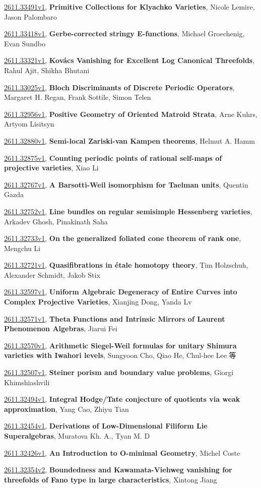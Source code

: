 \documentclass[9pt, a4paper]{article}
\theoremstyle{plain}
\theoremstyle{definition}
\theoremstyle{remark}
\newcommand{\arxiv}[3]{\href{https://arxiv.org/abs/#1}{#1}, \textbf{\textcolor{arxivblue}{#2}}, #3}
\begin{document}
\arxiv{2611.33491v1}{Primitive Collections for Klyachko Varieties}{Nicole Lemire, Jason Palombaro}

\arxiv{2611.33418v1}{Gerbe-corrected stringy E-functions}{Michael Groechenig, Evan Sundbo}

\arxiv{2611.33321v1}{Kovács Vanishing for Excellent Log Canonical Threefolds}{Rahul Ajit, Shikha Bhutani}

\arxiv{2611.33025v1}{Bloch Discriminants of Discrete Periodic Operators}{Margaret H. Regan, Frank Sottile, Simon Telen}

\arxiv{2611.32956v1}{Positive Geometry of Oriented Matroid Strata}{Arne Kuhrs, Artyom Lisitsyn}

\arxiv{2611.32880v1}{Semi-local Zariski-van Kampen theorems}{Helmut A. Hamm}

\arxiv{2611.32875v1}{Counting periodic points of rational self-maps of projective varieties}{Xiao Li}

\arxiv{2611.32767v1}{A Barsotti-Weil isomorphism for Taelman units}{Quentin Gazda}

\arxiv{2611.32752v1}{Line bundles on regular semisimple Hessenberg varieties}{Arkadev Ghosh, Pinakinath Saha}

\arxiv{2611.32733v1}{On the generalized foliated cone theorem of rank one}{Mengchu Li}

\arxiv{2611.32721v1}{Quasifibrations in étale homotopy theory}{Tim Holzschuh, Alexander Schmidt, Jakob Stix}

\arxiv{2611.32597v1}{Uniform Algebraic Degeneracy of Entire Curves into Complex Projective Varieties}{Xianjing Dong, Yanda Lv}

\arxiv{2611.32571v1}{Theta Functions and Intrinsic Mirrors of Laurent Phenomenon Algebras}{Jiarui Fei}

\arxiv{2611.32570v1}{Arithmetic Siegel-Weil formulas for unitary Shimura varieties with Iwahori levels}{Sungyoon Cho, Qiao He, Chul-hee Lee 等}

\arxiv{2611.32507v1}{Steiner porism and boundary value problems}{Giorgi Khimshiashvili}

\arxiv{2611.32494v1}{Integral Hodge/Tate conjecture of quotients via weak approximation}{Yang Cao, Zhiyu Tian}

\arxiv{2611.32454v1}{Derivations of Low-Dimensional Filiform Lie Superalgebras}{Muratova Kh. A., Tyan M. D}

\arxiv{2611.32426v1}{An Introduction to O-minimal Geometry}{Michel Coste}

\arxiv{2611.32354v2}{Boundedness and Kawamata-Viehweg vanishing for threefolds of Fano type in large characteristics}{Xintong Jiang}
\end{document}
